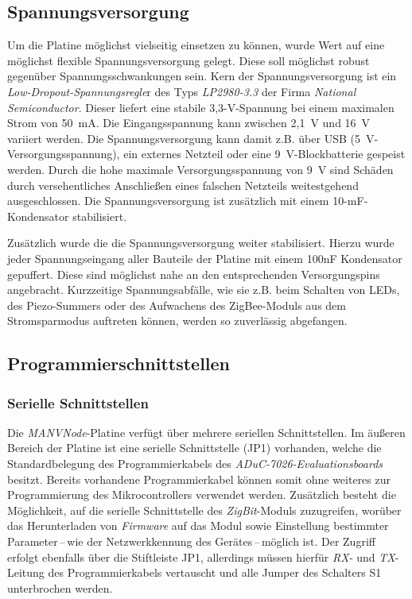 \subsection{Spannungsversorgung}
Um die Platine möglichst vielseitig einsetzen zu können, wurde Wert auf eine möglichst flexible Spannungsversorgung gelegt. Diese
soll möglichst robust gegenüber Spannungsschwankungen sein. Kern der Spannungsversorgung ist ein 
\emph{Low-Dropout-Spannungsregle}r des Typs \emph{LP2980-3.3} der Firma \emph{National Semiconductor}. Dieser liefert eine stabile
3,3-V-Spannung bei einem maximalen Strom von 50~mA. Die Eingangsspannung kann zwischen 2,1~V und 16~V variiert werden.
Die Spannungsversorgung kann damit z.B. über USB (5~V-Versorgungsspannung), ein externes Netzteil oder eine 
9~V-Blockbatterie gespeist werden. Durch die hohe maximale Versorgungsspannung von 9~V sind Schäden durch versehentliches
Anschließen eines falschen Netzteils weitestgehend ausgeschlossen. Die Spannungsversorgung ist zusätzlich mit einem 
10-mF-Kondensator stabilisiert.

Zusätzlich wurde die die Spannungsversorgung weiter stabilisiert. Hierzu wurde jeder Spannungseingang aller Bauteile der
Platine mit einem 100nF Kondensator gepuffert. Diese sind möglichst nahe an den entsprechenden Versorgungspins angebracht.
Kurzzeitige Spannungsabfälle, wie sie z.B. beim Schalten von LEDs, des Piezo-Summers oder des Aufwachens des ZigBee-Moduls
aus dem Stromsparmodus auftreten können, werden so zuverlässig abgefangen.

\subsection{Programmierschnittstellen}

\subsubsection{Serielle Schnittstellen}
Die \emph{MANVNode}-Platine verfügt über mehrere seriellen Schnittstellen. Im äußeren Bereich der Platine ist eine serielle 
Schnittstelle (JP1) vorhanden, welche die Standardbelegung des Programmierkabels des \emph{ADuC-7026-Evaluationsboards}
besitzt.  Bereits vorhandene Programmierkabel können somit ohne weiteres zur Programmierung des Mikrocontrollers 
verwendet werden.  Zusätzlich besteht die Möglichkeit, auf die serielle Schnittstelle des \emph{ZigBit}-Moduls 
zuzugreifen, worüber das Herunterladen von \emph{Firmware} auf das Modul sowie Einstellung bestimmter 
Parameter\,--\,wie der Netzwerkkennung des Gerätes\,--\,möglich ist.
Der Zugriff erfolgt ebenfalls über die Stiftleiste JP1, allerdings müssen hierfür \emph{RX-} und \emph{TX}-Leitung des 
Programmierkabels vertauscht und alle Jumper des Schalters S1 unterbrochen werden. 

